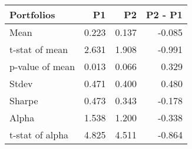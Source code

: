 \begin{tabular}{lrrr}
\toprule
Portfolios & P1 & P2 & P2 - P1 \\
\midrule
Mean & 0.223 & 0.137 & -0.085 \\
t-stat of mean & 2.631 & 1.908 & -0.991 \\
p-value of mean & 0.013 & 0.066 & 0.329 \\
Stdev & 0.471 & 0.400 & 0.480 \\
Sharpe & 0.473 & 0.343 & -0.178 \\
Alpha & 1.538 & 1.200 & -0.338 \\
t-stat of alpha & 4.825 & 4.511 & -0.864 \\
\bottomrule
\end{tabular}
